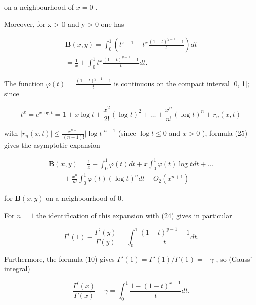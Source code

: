 on a neighbourhood of \(x = 0\) .

Moreover, for x \textgreater{} 0 and y \textgreater{} 0 one has

\[
\begin{array}{l} \mathbf {B} (x, y) = \int_ {0} ^ {1} \left(t ^ {x - 1} + t ^ {x} \frac {(1 - t) ^ {y - 1} - 1}{t}\right) d t \\ = \frac {1}{x} + \int_ {0} ^ {1} t ^ {x} \frac {(1 - t) ^ {y - 1} - 1}{t} d t. \end{array}\tag{25}
\]

The function \(\varphi(t) = \frac{(1 - t)^{y - 1} - 1}{t}\) is continuous on the compact interval {[}0, 1{]}; since

\[
t ^ {x} = e ^ {x \log t} = 1 + x \log t + \frac {x ^ {2}}{2 !} (\log t) ^ {2} + \dots + \frac {x ^ {n}}{n !} (\log t) ^ {n} + r _ {n} (x, t)
\]

with \(|r_n(x,t)| \leqslant \frac{x^{n+1}}{(n+1)!} |\log t|^{n+1}\) (since \(\log t \leqslant 0\) and \(x > 0\) ), formula (25) gives the asymptotic expansion

\[
\begin{array}{l} \mathbf {B} (x, y) = \frac {1}{x} + \int_ {0} ^ {1} \varphi (t) d t + x \int_ {0} ^ {1} \varphi (t) \log t d t + \dots \\ \qquad + \frac {x ^ {n}}{n !} \int_ {0} ^ {1} \varphi (t) (\log t) ^ {n} d t + O _ {2} (x ^ {n + 1}) \end{array}
\]

for \(\mathbf{B}(x,y)\) on a neighbourhood of 0.

For \(n = 1\) the identification of this expansion with (24) gives in particular

\[
\Gamma^ {\prime} (1) - \frac {\Gamma^ {\prime} (y)}{\Gamma (y)} = \int_ {0} ^ {1} \frac {(1 - t) ^ {y - 1} - 1}{t} d t.
\]

Furthermore, the formula (10) gives \(\Gamma'(1) = \Gamma'(1)/\Gamma(1) = -\gamma\) , so (Gauss' integral)

\[
\frac {\Gamma^ {\prime} (x)}{\Gamma (x)} + \gamma = \int_ {0} ^ {1} \frac {1 - (1 - t) ^ {x - 1}}{t} d t.\tag{26}
\]

